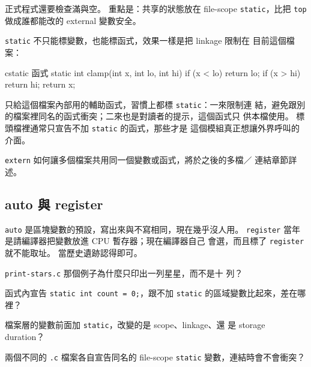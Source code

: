正式程式還要檢查滿與空。 重點是：共享的狀態放在 file-scope
\texttt{static}，比把 \texttt{top} 做成誰都能改的 external 變數安全。

\texttt{static} 不只能標變數，也能標函式，效果一樣是把 linkage 限制在
目前這個檔案：

\begin{code}{c}{static 函式}
static int clamp(int x, int lo, int hi) {
    if (x < lo) {
        return lo;
    }
    if (x > hi) {
        return hi;
    }
    return x;
}
\end{code}

只給這個檔案內部用的輔助函式，習慣上都標 \texttt{static}：一來限制連
結，避免跟別的檔案裡同名的函式衝突；二來也是對讀者的提示，這個函式只
供本檔使用。 標頭檔裡通常只宣告不加 \texttt{static} 的函式，那些才是
這個模組真正想讓外界呼叫的介面。


\texttt{extern} 如何讓多個檔案共用同一個變數或函式，將於之後的多檔／
連結章節詳述。


\subsection{auto 與 register}

\texttt{auto} 是區塊變數的預設，寫出來與不寫相同，現在幾乎沒人用。
\texttt{register} 當年是請編譯器把變數放進 CPU 暫存器；現在編譯器自己
會選，而且標了 \texttt{register} 就不能取址。 當歷史遺跡認得即可。


\begin{drills}[label=drills:decl-static]
\item \texttt{print-stars.c} 那個例子為什麼只印出一列星星，而不是十
列？
\item 函式內宣告 \texttt{static int count = 0;}，跟不加 \texttt{static}
的區域變數比起來，差在哪裡？
\item 檔案層的變數前面加 \texttt{static}，改變的是 scope、linkage、還
是 storage duration？
\item 兩個不同的 \texttt{.c} 檔案各自宣告同名的 file-scope
\texttt{static} 變數，連結時會不會衝突？
\end{drills}

